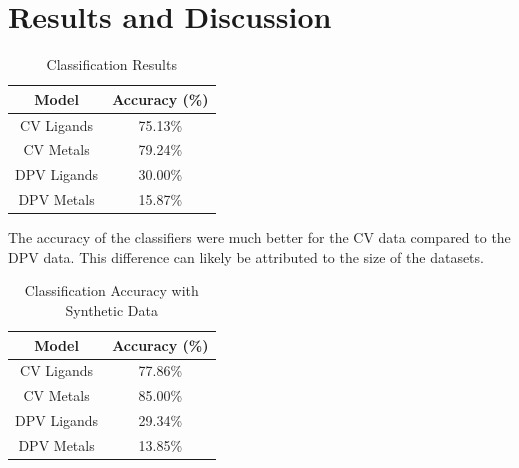 \section{Results and Discussion}
\begin{table}[!h]
\begin{center}
\begin{tabular}{c|c}
Model & Accuracy (\%) \\
\hline
CV Ligands & 75.13\% \\
CV Metals & 79.24\% \\
DPV Ligands & 30.00\% \\
DPV Metals & 15.87\%
\end{tabular}
\caption{Classification Results}
\end{center}
\end{table}
The accuracy of the classifiers were much better for the CV data compared to the DPV data. This difference can likely be attributed to the size of the datasets. 
\begin{table}[!h]
\begin{center}
\begin{tabular}{c|c}
Model & Accuracy (\%) \\
\hline
CV Ligands & 77.86\% \\
CV Metals & 85.00\% \\
DPV Ligands & 29.34\% \\
DPV Metals & 13.85\%
\end{tabular}
\caption{Classification Accuracy with Synthetic Data}
\end{center}
\end{table}
